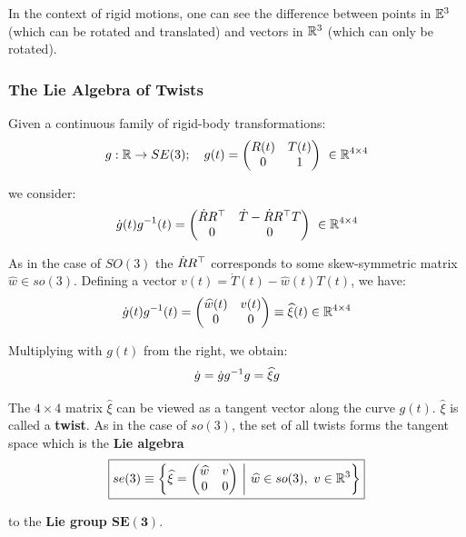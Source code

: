 In the context of rigid motions, one can see the difference
between points in $\mathbb{E}^3$ (which can be rotated and translated)
and vectors in $\mathbb{R}^3$ (which can only be rotated).


\subsubsection{The Lie Algebra of Twists}%
\label{ssub:the_lie_algebra_of_twists}

Given a continuous family of rigid-body transformations:
	\[g : \mathbb{R} \rightarrow SE(3);\quad g(t) = \begin{pmatrix}
		R(t) & T(t) \\
		0 & 1 \\
	\end{pmatrix}\ \in \mathbb{R}^{4 \times{} 4}\]

we consider:
	\[\dot{g}(t)g^{-1}(t) = \begin{pmatrix}
		\dot{R}R^{\top} & \dot{T} - \dot{R}R^{\top}T \\
		0 & 0 \\
	\end{pmatrix}\ \in \mathbb{R}^{4 \times{} 4}\]

As in the case of $SO(3)$ the $\dot{R}R^{\top}$ corresponds
to some skew-symmetric matrix $\widehat{w} \in so(3)$. Defining a vector
$v(t) = \dot{T}(t) - \widehat{w}(t)T(t)$, we have:
	\[\dot{g}(t)g^{-1}(t) = \begin{pmatrix}
		\widehat{w}(t) & v(t) \\
		0 & 0 \\
	\end{pmatrix} \equiv \widehat{\xi}(t) \in \mathbb{R}^{4 \times{} 4}\]

Multiplying with $g(t)$ from the right, we obtain:
	\[\dot{g} = \dot{g}g^{-1}g = \widehat{\xi}g\]

The $4 \times 4$ matrix $\widehat{\xi}$ can be viewed as a tangent vector
along the curve $g(t)$. $\widehat{\xi}$ is called a \textbf{twist}.
As in the case of $so(3)$, the set of all twists forms the tangent
space which is the \textbf{Lie algebra}
	\[\boxed{se(3) \equiv \left\{ \widehat{\xi} = \begin{pmatrix}
		\widehat{w} & v \\
		0 & 0 \\
	\end{pmatrix}\ \middle|
	\ \widehat{w} \in so(3),\ v \in \mathbb{R}^3 \right\}}\]

	to the \textbf{Lie group $\bm{SE(3)}$}.\\

